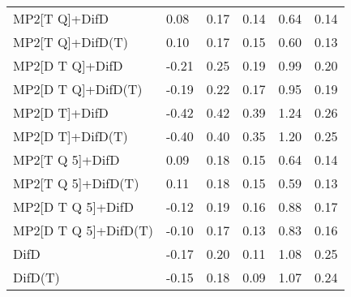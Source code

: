 \begin{table}
\begin{tabular}{l l l l l l }
    MP2[T Q]+DifD & 0.08 & 0.17 & 0.14 & 0.64 & 0.14 \\ 
    MP2[T Q]+DifD(T) & 0.10 & 0.17 & 0.15 & 0.60 & 0.13 \\ 
    MP2[D T Q]+DifD & -0.21 & 0.25 & 0.19 & 0.99 & 0.20 \\ 
    MP2[D T Q]+DifD(T) & -0.19 & 0.22 & 0.17 & 0.95 & 0.19 \\ 
    MP2[D T]+DifD & -0.42 & 0.42 & 0.39 & 1.24 & 0.26 \\ 
    MP2[D T]+DifD(T) & -0.40 & 0.40 & 0.35 & 1.20 & 0.25 \\ 
    MP2[T Q 5]+DifD & 0.09 & 0.18 & 0.15 & 0.64 & 0.14 \\ 
    MP2[T Q 5]+DifD(T) & 0.11 & 0.18 & 0.15 & 0.59 & 0.13 \\ 
    MP2[D T Q 5]+DifD & -0.12 & 0.19 & 0.16 & 0.88 & 0.17 \\ 
    MP2[D T Q 5]+DifD(T) & -0.10 & 0.17 & 0.13 & 0.83 & 0.16 \\ 
    DifD & -0.17 & 0.20 & 0.11 & 1.08 & 0.25 \\ 
    DifD(T) & -0.15 & 0.18 & 0.09 & 1.07 & 0.24 \\ 
    \bottomrule
  \end{tabular}
\end{table}
